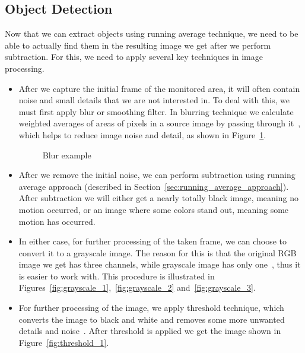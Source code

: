 	\subsection{Object Detection}
	Now that we can extract objects using running average technique, we need to be able to actually find them in the resulting image we get after we perform subtraction. For this, we need to apply several key techniques in image processing. 
	
	\begin{itemize}
	\item After we capture the initial frame of the monitored area, it will often contain noise and small details that we are not interested in. To deal with this, we must first apply blur or smoothing filter. In blurring technique we calculate weighted averages of areas of pixels in a source image by passing through it~\cite{blur_1}, which helps to reduce image noise and detail, as shown in Figure~\ref{fig:blur_example}.
	\begin{figure}[ht]
		\centering
		\quad
		\caption{Blur example}
		\label{fig:blur_example}
	\end{figure}
	
	\item After we remove the initial noise, we can perform subtraction using running average approach (described in Section~\ref{sec:running_average_approach}). After subtraction we will either get a nearly totally black image, meaning no motion occurred, or an image where some colors stand out, meaning some motion has occurred. 
	
	\item In either case, for further processing of the taken frame, we can choose to convert it to a grayscale image. The reason for this is that the original RGB image we get has three channels, while grayscale image has only one~\cite{grayscale_1}, thus it is easier to work with. This procedure is illustrated in Figures~\ref{fig:grayscale_1},~\ref{fig:grayscale_2} and~\ref{fig:grayscale_3}. 
	
	\item For further processing of the image, we apply threshold technique, which converts the image to black and white and removes some more unwanted details and noise~\cite{threshold_1}. After threshold is applied we get the image shown in Figure~\ref{fig:threshold_1}. 
	

\end{itemize}
